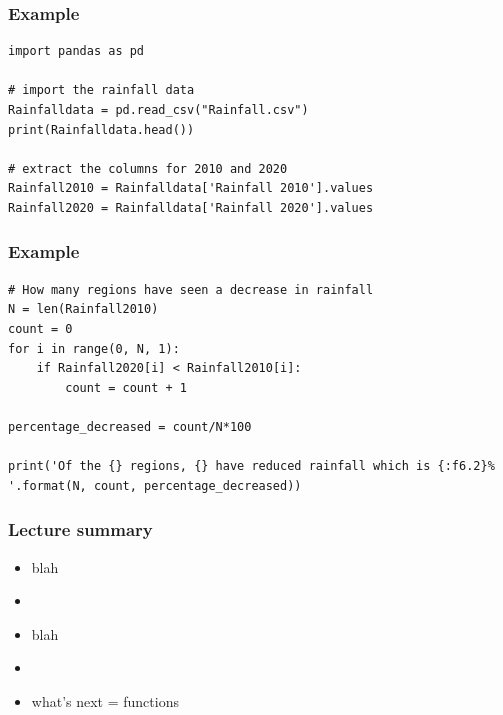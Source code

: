 \documentclass[english,14pt]{beamer}
\begin{document}

\begin{frame}[fragile]
\frametitle{Example}
\begin{lstlisting}[style=CStyle]
import pandas as pd

# import the rainfall data 
Rainfalldata = pd.read_csv("Rainfall.csv")
print(Rainfalldata.head())

# extract the columns for 2010 and 2020 
Rainfall2010 = Rainfalldata['Rainfall 2010'].values         
Rainfall2020 = Rainfalldata['Rainfall 2020'].values         

\end{lstlisting}
\end{frame}


\begin{frame}[fragile]
\frametitle{Example}
\begin{lstlisting}[style=CStyle]
# How many regions have seen a decrease in rainfall 
N = len(Rainfall2010)
count = 0
for i in range(0, N, 1):
    if Rainfall2020[i] < Rainfall2010[i]:
        count = count + 1

percentage_decreased = count/N*100

print('Of the {} regions, {} have reduced rainfall which is {:f6.2}% '.format(N, count, percentage_decreased))
\end{lstlisting}
\end{frame}


\begin{frame}[fragile]

\frametitle{Lecture summary}
\begin{itemize}
	\item blah
	\item[]
	
	\item blah
	\item[]
	
	\item what's next = functions
\end{itemize}
\end{frame}
\end{document}
